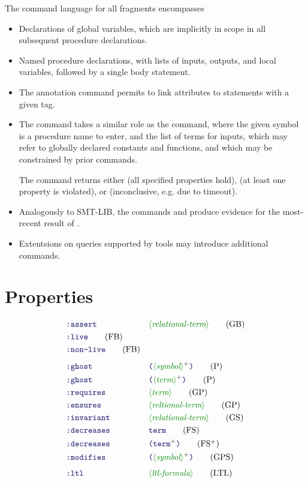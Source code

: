 \documentclass[runningheads]{llncs}
\begin{document}
\noindent
The command language for all fragments encompasses
\begin{itemize}
\item Declarations of global variables,
      which are implicitly in scope in all subsequent procedure declarations.
\item Named procedure declarations,
      with lists of inputs, outputs, and local variables,
      followed by a single body statement.
\item The annotation command permits to link attributes
      to statements with a given tag.
\item The  command takes a similar role as the  command,
      where the given symbol is a procedure name to enter,
      and the list of terms for inputs,
      which may refer to globally declared constants and functions,
      and which may be constrained by prior  commands.

      The command returns either  (all specified properties hold),
       (at least one property is violated),
      or  (inconclusive, e.g. due to timeout).
\item Analogously to SMT-LIB, the commands 
      and  produce evidence
      for the most-recent result of .
\item Extentsions on queries supported by tools may introduce additional commands.
\end{itemize}

\section{Properties}

\begin{align}
& \terminal{:assert}
    && \nonterminal{relational-term}
    \tag{GB} \\
& \terminal{:live}
    \tag{FB} \\
& \terminal{:non-live}
    \tag{FB} \\[4pt]
& \terminal{:ghost}
    && \LP \nonterminal{symbol}\rplus \RP
    \tag{P} \\
& \terminal{:ghost}
    && \LP \nonterminal{term}\rplus \RP
    \tag{P} \\
& \terminal{:requires}
    && \nonterminal{term}
    \tag{GP} \\
& \terminal{:ensures}
    && \nonterminal{reltional-term}
    \tag{GP} \\
& \terminal{:invariant}
    && \nonterminal{relational-term}
    \tag{GS} \\
& \terminal{:decreases}
    && \terminal{term}
    \tag{FS} \\
& \terminal{:decreases}
    && \LP \terminal{term}\rplus \RP
    \tag{FS$^+$} \\
& \terminal{:modifies}
    && \LP \nonterminal{symbol}\rplus \RP
    \tag{GPS} \\[4pt]
& \terminal{:ltl}
    && \nonterminal{ltl-formula}
    \tag{LTL}
\end{align}
\end{document}
